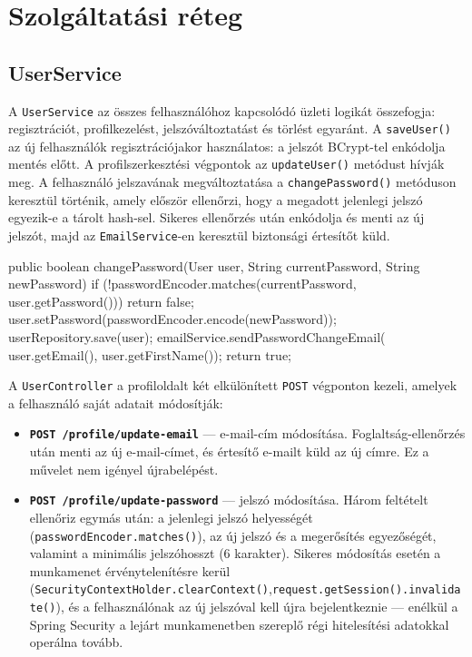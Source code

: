 \section{Szolgáltatási réteg}

\subsection{UserService}

A \texttt{UserService} az összes felhasználóhoz kapcsolódó üzleti logikát összefogja: regisztrációt, profilkezelést, jelszóváltoztatást és törlést egyaránt.
A \texttt{saveUser()} az új felhasználók regisztrációjakor használatos: a jelszót BCrypt-tel enkódolja mentés előtt. A profilszerkesztési végpontok az \texttt{updateUser()} metódust hívják meg.
A felhasználó jelszavának megváltoztatása a \texttt{changePassword()} metóduson keresztül történik, amely először ellenőrzi, hogy a megadott jelenlegi jelszó egyezik-e a tárolt hash-sel. Sikeres ellenőrzés után enkódolja és menti az új jelszót, majd az \texttt{EmailService}-en keresztül biztonsági értesítőt küld.

\begin{java}[caption={Jelszóváltoztatás logikája a UserService-ben},label=java:userservice_pw]
public boolean changePassword(User user,
        String currentPassword,
        String newPassword) {
    if (!passwordEncoder.matches(currentPassword, user.getPassword())) {
        return false;
    }
    user.setPassword(passwordEncoder.encode(newPassword));
    userRepository.save(user);
    emailService.sendPasswordChangeEmail(
            user.getEmail(), user.getFirstName());
    return true;
}
\end{java}

A \texttt{UserController} a profiloldalt két elkülönített \texttt{POST} végponton kezeli, amelyek a felhasználó saját adatait módosítják:

\begin{itemize}
\item \textbf{\texttt{POST /profile/update-email}} — e-mail-cím módosítása. Foglaltság-ellenőrzés után menti az új e-mail-címet, és értesítő e-mailt küld az új címre. Ez a művelet nem igényel újrabelépést.
\item \textbf{\texttt{POST /profile/update-password}} — jelszó módosítása. Három feltételt ellenőriz egymás után: a jelenlegi jelszó helyességét (\texttt{passwordEncoder.matches()}), az új jelszó és a megerősítés egyezőségét, valamint a minimális jelszóhosszt (6 karakter). Sikeres módosítás esetén a munkamenet érvénytelenítésre kerül (\texttt{Security\-Context\-Holder.\-clear\-Context()},\linebreak[0] \texttt{request.\-getSession().\-invalidate()}), és a felhasználónak az új jelszóval kell újra bejelentkeznie — enélkül a Spring Security a lejárt munkamenetben szereplő régi hitelesítési adatokkal operálna tovább.
\end{itemize}


